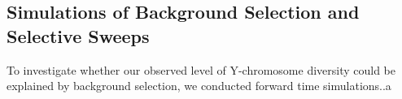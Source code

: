 \documentclass[9pt,twocolumn,twoside]{gsajnl}
\begin{document}
\subsection*{Simulations of Background Selection and Selective Sweeps}
To investigate whether our observed level of Y-chromosome diversity could be explained by background selection, we conducted forward time simulations..a %



\end{document}
